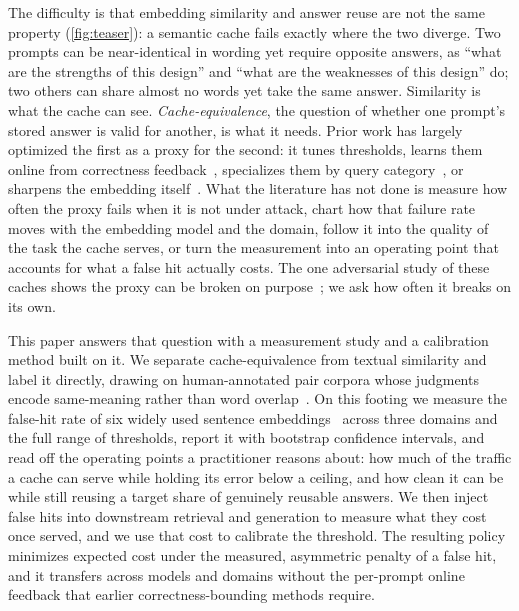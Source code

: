 The difficulty is that embedding similarity and answer reuse are not the same property
(\cref{fig:teaser}): a semantic cache fails exactly where the two diverge.
Two prompts can be near-identical in wording yet require opposite answers, as ``what are
the strengths of this design'' and ``what are the weaknesses of this design'' do; two
others can share almost no words yet take the same answer. Similarity is what the cache
can see. \emph{Cache-equivalence}, the question of whether one prompt's stored answer is
valid for another, is what it needs. Prior work has largely optimized the first as a
proxy for the second: it tunes thresholds, learns them online from correctness
feedback~\cite{schroeder2025vcache}, specializes them by query
category~\cite{wang2025categoryaware}, or sharpens the embedding
itself~\cite{gill2025advancing}. What the literature has not done is measure how often
the proxy fails when it is not under attack, chart how that failure rate moves with the
embedding model and the domain, follow it into the quality of the task the cache serves,
or turn the measurement into an operating point that accounts for what a false hit
actually costs. The one adversarial study of these caches shows the proxy can be broken
on purpose~\cite{zhang2026keycollision}; we ask how often it breaks on its own.

This paper answers that question with a measurement study and a calibration method built
on it. We separate cache-equivalence from textual similarity and label it directly,
drawing on human-annotated pair corpora whose judgments encode same-meaning rather than
word overlap~\cite{zhang2019paws,wang2019glue,dolan2005mrpc}. On this footing we measure
the false-hit rate of six widely used sentence
embeddings~\cite{reimers2019sentencebert,wang2022e5,xiao2023cpack} across three domains
and the full range of thresholds, report it with bootstrap confidence intervals, and
read off the operating points a practitioner reasons about: how much of the traffic a
cache can serve while holding its error below a ceiling, and how clean it can be while
still reusing a target share of genuinely reusable answers. We then inject false hits
into downstream retrieval and generation to measure what they cost once served, and we
use that cost to calibrate the threshold. The resulting policy minimizes expected cost
under the measured, asymmetric penalty of a false hit, and it transfers across models
and domains without the per-prompt online feedback that earlier correctness-bounding
methods require.

